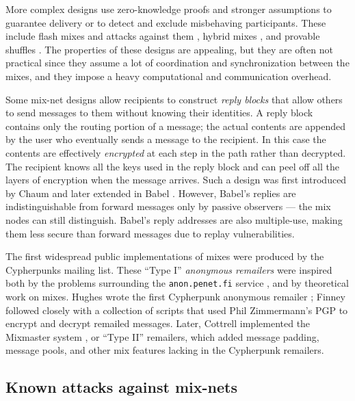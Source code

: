 \documentclass[11pt]{IEEEtran}
\begin{document}
More complex designs use zero-knowledge proofs and stronger assumptions
to guarantee delivery or to detect and exclude misbehaving participants.
These include flash mixes \cite{flash-mix} and attacks against them
\cite{mitkuro}, hybrid mixes \cite{jakobsson-optimally}\cite{hybrid-mix},
and provable shuffles \cite{PShuffle}\cite{shuffle}. The properties
of these designs are appealing, but they are often not practical since
they assume a lot of coordination and synchronization between the mixes,
and they impose a heavy computational and communication overhead.

Some mix-net designs allow recipients to construct \emph{reply blocks}
that allow others to send messages to them without knowing their
identities. A reply block contains only the routing portion of a message;
the actual contents are appended by the user who eventually sends a
message to the recipient. In this case the contents are effectively
\emph{encrypted} at each step in the path rather than decrypted.
The recipient knows all the keys used in the reply block and can peel
off all the layers of encryption when the message arrives. Such a design
was first introduced by Chaum \cite{chaum-mix} and later extended in
Babel \cite{babel}. However, Babel's replies are indistinguishable from
forward messages only by passive observers --- the mix nodes can still
distinguish. Babel's reply addresses are also multiple-use, making them
less secure than forward messages due to replay vulnerabilities.

The first widespread public implementations of mixes were produced by the
Cypherpunks mailing list. These ``Type I'' \emph{anonymous remailers}
were inspired both by the problems surrounding the {\tt anon.penet.fi}
service \cite{helsingius}, and by theoretical work on mixes. Hughes
wrote the first Cypherpunk anonymous remailer \cite{remailer-history};
Finney followed closely with a collection of scripts that used Phil
Zimmermann's PGP to encrypt and decrypt remailed messages. Later, Cottrell
implemented the Mixmaster system \cite{mixmaster}\cite{mixmaster-spec},
or ``Type II'' remailers, which added message padding, message pools,
and other mix features lacking in the Cypherpunk remailers.

\subsection{Known attacks against mix-nets}
\end{document}
